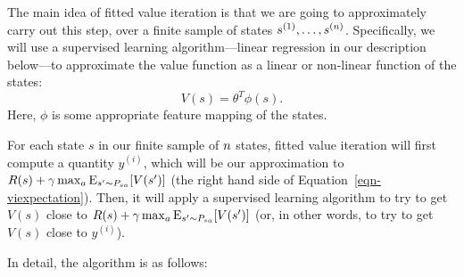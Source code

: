\documentclass{article}
\begin{document}
The main idea of fitted value iteration
is that we are going to approximately carry out this step, over a finite sample
of states $s^{(1)}, \ldots, s^{({n})}$.  Specifically, we will use a supervised learning
algorithm---linear regression in our description below---to approximate the value function
as a linear or non-linear function of the states:
\[
V(s) = \theta^T \phi(s).
\]
Here, $\phi$ is some appropriate
feature mapping of the states.

For each state $s$ in our finite sample of ${n}$ states, fitted value iteration
will first compute a quantity $y^{(i)}$, which will be our approximation
to $R(s) + \gamma \max_a {\rm E}_{s' \sim P_{sa}} [V(s')]$ (the right hand side of
 Equation~\ref{eqn-viexpectation}).  Then, it will apply a supervised
learning algorithm to try to get $V(s)$ close to $R(s) + \gamma \max_a {\rm E}_{s' \sim P_{sa}} [V(s')]$
(or, in other words, to try to get $V(s)$ close to $y^{(i)}$).

In detail, the algorithm is as follows:
\end{document}
